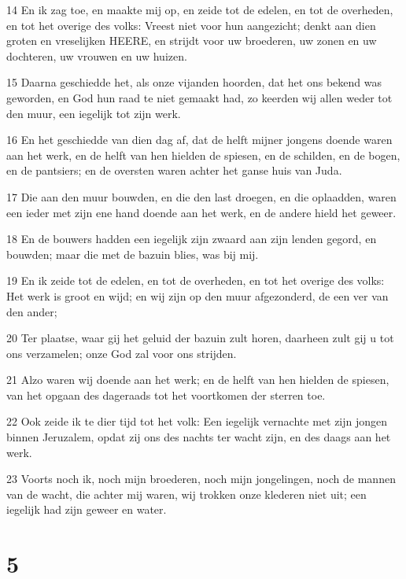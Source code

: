 \par 14 En ik zag toe, en maakte mij op, en zeide tot de edelen, en tot de overheden, en tot het overige des volks: Vreest niet voor hun aangezicht; denkt aan dien groten en vreselijken HEERE, en strijdt voor uw broederen, uw zonen en uw dochteren, uw vrouwen en uw huizen.
\par 15 Daarna geschiedde het, als onze vijanden hoorden, dat het ons bekend was geworden, en God hun raad te niet gemaakt had, zo keerden wij allen weder tot den muur, een iegelijk tot zijn werk.
\par 16 En het geschiedde van dien dag af, dat de helft mijner jongens doende waren aan het werk, en de helft van hen hielden de spiesen, en de schilden, en de bogen, en de pantsiers; en de oversten waren achter het ganse huis van Juda.
\par 17 Die aan den muur bouwden, en die den last droegen, en die oplaadden, waren een ieder met zijn ene hand doende aan het werk, en de andere hield het geweer.
\par 18 En de bouwers hadden een iegelijk zijn zwaard aan zijn lenden gegord, en bouwden; maar die met de bazuin blies, was bij mij.
\par 19 En ik zeide tot de edelen, en tot de overheden, en tot het overige des volks: Het werk is groot en wijd; en wij zijn op den muur afgezonderd, de een ver van den ander;
\par 20 Ter plaatse, waar gij het geluid der bazuin zult horen, daarheen zult gij u tot ons verzamelen; onze God zal voor ons strijden.
\par 21 Alzo waren wij doende aan het werk; en de helft van hen hielden de spiesen, van het opgaan des dageraads tot het voortkomen der sterren toe.
\par 22 Ook zeide ik te dier tijd tot het volk: Een iegelijk vernachte met zijn jongen binnen Jeruzalem, opdat zij ons des nachts ter wacht zijn, en des daags aan het werk.
\par 23 Voorts noch ik, noch mijn broederen, noch mijn jongelingen, noch de mannen van de wacht, die achter mij waren, wij trokken onze klederen niet uit; een iegelijk had zijn geweer en water.

\chapter{5}

